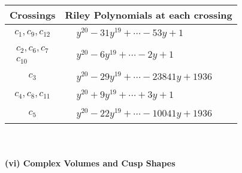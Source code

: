 \documentclass[1p]{elsarticle_modified}
\theoremstyle{definition}
\begin{document}
\begin{tabular}{m{50pt}|m{274pt}}
Crossings & \hspace{64pt}Riley Polynomials at each crossing \\
\hline $$\begin{aligned}c_{1},c_{9},c_{12}\end{aligned}$$&$\begin{aligned}
&y^{20}-31 y^{19}+\cdots-53 y+1
\end{aligned}$\\
\hline $$\begin{aligned}c_{2},c_{6},c_{7}\\c_{10}\end{aligned}$$&$\begin{aligned}
&y^{20}-6 y^{19}+\cdots-2 y+1
\end{aligned}$\\
\hline $$\begin{aligned}c_{3}\end{aligned}$$&$\begin{aligned}
&y^{20}-29 y^{19}+\cdots-23841 y+1936
\end{aligned}$\\
\hline $$\begin{aligned}c_{4},c_{8},c_{11}\end{aligned}$$&$\begin{aligned}
&y^{20}+9 y^{19}+\cdots+3 y+1
\end{aligned}$\\
\hline $$\begin{aligned}c_{5}\end{aligned}$$&$\begin{aligned}
&y^{20}-22 y^{19}+\cdots-10041 y+1936
\end{aligned}$\\
\hline
\end{tabular}\\~\\
\newpage\flushleft \textbf{(vi) Complex Volumes and Cusp Shapes}
\end{document}
